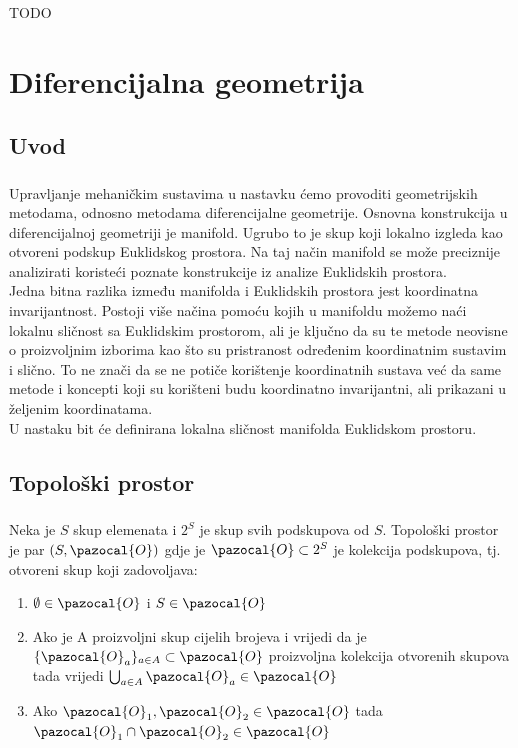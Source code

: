\documentclass[times, utf8, diplomski]{fer}
\newcommand{\Oa}{\pazocal{O}}
\begin{document}
\paragraph{}
TODO

\newpage 
\clearpage

\chapter{Diferencijalna geometrija}

\section{Uvod}
	\paragraph{} Upravljanje mehaničkim sustavima u nastavku ćemo provoditi geometrijskih metodama, odnosno metodama diferencijalne geometrije. Osnovna konstrukcija u diferencijalnoj geometriji je manifold. Ugrubo to je skup koji lokalno izgleda kao otvoreni podskup Euklidskog prostora. Na taj način manifold se može preciznije analizirati koristeći poznate konstrukcije iz analize Euklidskih prostora. \\ 
	Jedna bitna razlika između manifolda i Euklidskih prostora jest koordinatna invarijantnost. Postoji više načina pomoću kojih u manifoldu možemo naći lokalnu sličnost sa Euklidskim prostorom, ali je ključno da su te metode neovisne o proizvoljnim izborima kao što su pristranost određenim koordinatnim sustavim i slično. To ne znači da se ne potiče korištenje koordinatnih sustava već da same metode i koncepti koji su korišteni budu koordinatno invarijantni, ali prikazani u željenim koordinatama. \\
	U nastaku bit će definirana lokalna sličnost manifolda Euklidskom prostoru.

\section{Topološki prostor}
	
	\paragraph{}Neka je $S$ skup elemenata i $2^S$ je skup svih podskupova od $S$. Topološki prostor je par $(S, \Oa)$ gdje je $\Oa\subset2^S$ je kolekcija podskupova, tj. otvoreni skup koji zadovoljava:
	\begin{enumerate}
		\item $\emptyset \in \Oa$ i $S \in \Oa$ 
		\item Ako je A proizvoljni skup cijelih brojeva i vrijedi da je $\{ \Oa_{a} \}_{a\in A}\subset \Oa$ proizvoljna kolekcija otvorenih skupova tada vrijedi $\bigcup_{a\in A}\Oa_a\in \Oa$
		\item Ako $\Oa_1, \Oa_2 \in \Oa$ tada $\Oa_1 \cap \Oa_2 \in \Oa$
	\end{enumerate}
\end{document}
